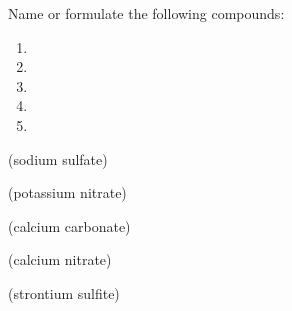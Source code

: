\documentclass[main.tex]{subfiles}
\begin{document}
\begin{multicols*}{2}
\begin{question}[ID=\the\value{numA}]
Name or formulate the following compounds:
   \begin{multicols}{2}\noindent
  \begin{enumerate} [topsep=0pt, partopsep=0pt, label=(\alph*), leftmargin=.5cm]
\item  {} %
\item  {} %
\item  {} %
\item  {} %
\item  {} %
\end{enumerate}  \end{multicols} 
\end{question}
\begin{solution}
\begin{inparaenum}[(a)]
\item  {}  (sodium sulfate)
\item  {}  (potassium nitrate)
\item  {}  (calcium carbonate)
\item  {}  (calcium nitrate)
\item  {}  (strontium sulfite)
\end{inparaenum}\hspace{0.1cm}\end{solution}



\end{multicols*}
\end{document}
